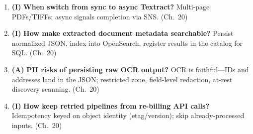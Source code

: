 \begin{enumerate}
    \item \textbf{(I)} \textbf{When switch from sync to async Textract?}
    Multi-page PDFs/TIFFs; async signals completion via SNS. (Ch.~20)
    \item \textbf{(I)} \textbf{How make extracted document metadata searchable?}
    Persist normalized JSON, index into OpenSearch, register results in the catalog for SQL.
    (Ch.~20)
    \item \textbf{(A)} \textbf{PII risks of persisting raw OCR output?}
    OCR is faithful---IDs and addresses land in the JSON; restricted zone, field-level redaction,
    at-rest discovery scanning. (Ch.~20)
    \item \textbf{(I)} \textbf{How keep retried pipelines from re-billing API calls?}
    Idempotency keyed on object identity (etag/version); skip already-processed inputs. (Ch.~20)
\end{enumerate}

